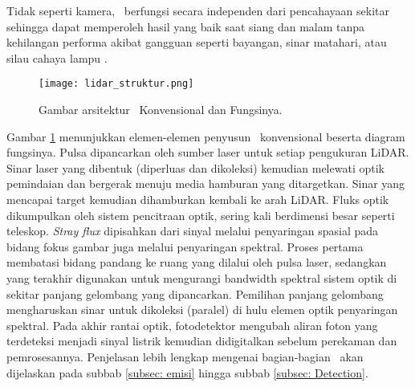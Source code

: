     Tidak seperti kamera, \lidar\ berfungsi secara independen dari pencahayaan sekitar sehingga dapat memperoleh hasil yang baik saat siang dan malam tanpa kehilangan performa akibat gangguan seperti bayangan, sinar matahari, atau silau cahaya lampu \cite{bs8}.
    \begin{figure}[H]
        \centering
        \texttt{[image: lidar\_struktur.png]}
        \caption{Gambar arsitektur \lidar\ Konvensional dan Fungsinya\cite{bs9}.}
        \label{fig:Ch02_lidar_struktur}
    \end{figure}
    Gambar \ref*{fig:Ch02_lidar_struktur} menunjukkan elemen-elemen penyusun \lidar\ konvensional beserta diagram fungsinya.
    Pulsa dipancarkan oleh sumber laser untuk setiap pengukuran LiDAR. Sinar laser yang dibentuk (diperluas dan dikoleksi) kemudian melewati optik pemindaian dan bergerak menuju media hamburan yang ditargetkan. Sinar yang mencapai target kemudian dihamburkan kembali ke arah LiDAR. Fluks optik dikumpulkan oleh sistem pencitraan optik, sering kali berdimensi besar seperti teleskop. 
    \textit{Stray flux} dipisahkan dari sinyal melalui penyaringan spasial pada bidang fokus gambar juga melalui penyaringan spektral. Proses pertama membatasi bidang pandang ke ruang yang dilalui oleh pulsa laser, sedangkan yang terakhir digunakan untuk mengurangi bandwidth spektral sistem optik di sekitar panjang gelombang yang dipancarkan. Pemilihan panjang gelombang mengharuskan sinar untuk dikoleksi (paralel) di hulu elemen optik penyaringan spektral. Pada akhir rantai optik, fotodetektor mengubah aliran foton yang terdeteksi menjadi sinyal listrik kemudian  didigitalkan sebelum perekaman dan pemrosesannya. Penjelasan lebih lengkap mengenai bagian-bagian \lidar\ akan dijelaskan pada subbab \ref*{subsec: emisi} hingga subbab \ref*{subsec: Detection}.
